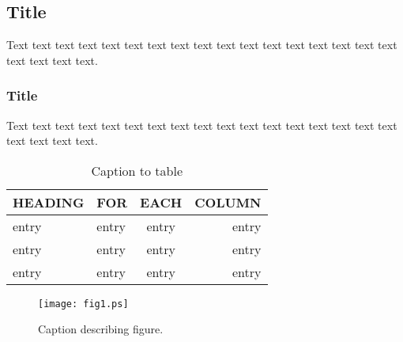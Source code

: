 \documentclass[preprint]{iucr}              %
\begin{document}
\subsection{Title}

Text text text text text text text text text text text text text text
text text text text text text text.

\subsubsection{Title}

Text text text text text text text text text text text text text text
text text text text text text text.






\begin{references}
\end{references}



\begin{table}
\caption{Caption to table}
\begin{tabular}{llcr}      %
 HEADING    & FOR        & EACH       & COLUMN     \\
\hline
 entry      & entry      & entry      & entry      \\
 entry      & entry      & entry      & entry      \\
 entry      & entry      & entry      & entry      \\
\end{tabular}
\end{table}


\begin{figure}
\caption{Caption describing figure.}
\texttt{[image: fig1.ps]}
\end{figure}



\end{document}
